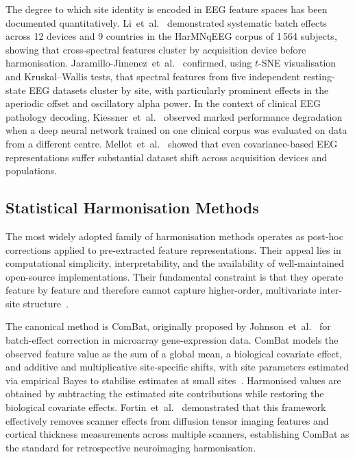 \documentclass[preprint,12pt]{elsarticle}
\begin{document}
The degree to which site identity is encoded in EEG feature spaces
has been documented quantitatively.
Li~et~al.~\cite{li2022harmnqeeg} demonstrated systematic batch
effects across 12 devices and 9 countries in the HarMNqEEG corpus of
1\,564 subjects, showing that cross-spectral features cluster by
acquisition device before harmonisation.
Jaramillo-Jimenez~et~al.~\cite{jaramillo2024combat} confirmed, using
$t$-SNE visualisation and Kruskal--Wallis tests, that spectral
features from five independent resting-state EEG datasets cluster by
site, with particularly prominent effects in the aperiodic offset and
oscillatory alpha power.
In the context of clinical EEG pathology decoding,
Kiessner~et~al.~\cite{kiessner2023extended} observed marked
performance degradation when a deep neural network trained on one
clinical corpus was evaluated on data from a different centre.
Mellot~et~al.~\cite{mellot2023meeg} showed that even
covariance-based EEG representations suffer substantial dataset shift
across acquisition devices and populations.

\subsection{Statistical Harmonisation Methods}
\label{subsec:statistical_harmonisation}

The most widely adopted family of harmonisation methods operates as
post-hoc corrections applied to pre-extracted feature representations.
Their appeal lies in computational simplicity, interpretability, and
the availability of well-maintained open-source implementations.
Their fundamental constraint is that they operate feature by feature
and therefore cannot capture higher-order, multivariate inter-site
structure~\cite{hu2023image,jaramillo2024combat}.

The canonical method is ComBat, originally proposed by
Johnson~et~al.~\cite{johnson2007adjusting} for batch-effect
correction in microarray gene-expression data.
ComBat models the observed feature value as the sum of a global
mean, a biological covariate effect, and additive and multiplicative
site-specific shifts, with site parameters estimated via empirical
Bayes to stabilise estimates at small
sites~\cite{johnson2007adjusting}.
Harmonised values are obtained by subtracting the estimated site
contributions while restoring the biological covariate effects.
Fortin~et~al.~\cite{fortin2017harmonization,fortin2018cortical}
demonstrated that this framework effectively removes scanner effects
from diffusion tensor imaging features and cortical thickness
measurements across multiple scanners, establishing ComBat as the
standard for retrospective neuroimaging harmonisation.
\end{document}
